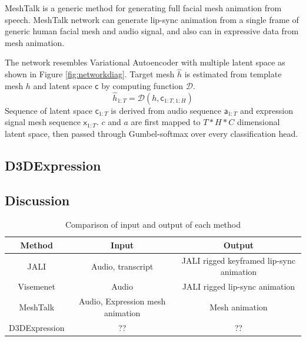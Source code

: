 \documentclass[10pt,twocolumn,letterpaper]{article}
\begin{document}
MeshTalk is a generic method for generating full facial mesh animation from speech. MeshTalk network can generate lip-sync animation from a single frame of generic human facial mesh and audio signal, and also can in expressive data from mesh animation.

The network resembles Variational Autoencoder with multiple latent space as shown in Figure \ref{fig:networkdiag}.
Target mesh \(\hat{h}\) is estimated from template mesh \(h\) and latent space \(\mathsf{c}\) by computing function \(\mathcal{D}\).
\begin{equation}
  \hat{h}_{1:T} = \mathcal{D}(h, \mathsf{c}_{1:T, 1:H})
  \label{eq:1}
\end{equation}
Sequence of latent space \(\mathsf{c}_{1:T}\) is derived from audio sequence \(\mathsf{a}_{1:T}\) and expression signal mesh sequence \(\mathsf{x}_{1:T}\).
\(c\) and \(a\) are first mapped to \(T*H*C\) dimensional latent space, then passed through Gumbel-softmax\cite{jangCategoricalReparameterizationGumbelSoftmax2017} over every classification head.


\subsection{D3DExpression}

\subsection{Discussion}

\begin{table}
   \centering
   \begin{tabular}{c|cc}
      \toprule
      Method & Input & Output \\
      \midrule
      JALI & Audio, transcript & JALI rigged keyframed lip-sync animation \\
      Visemenet & Audio & JALI rigged lip-sync animation \\
      MeshTalk & Audio, Expression mesh animation & Mesh animation\\
      D3DExpression & ?? & ??\\
      \bottomrule
   \end{tabular}
   \caption{Comparison of input and output of each method}
   \label{table:io_cmp}
\end{table}
\end{document}
